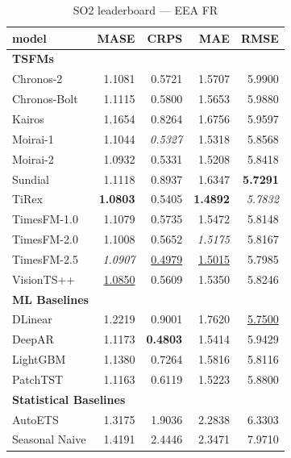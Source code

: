 \begin{table}[H]
\caption{SO2 leaderboard --- EEA FR}
\centering
\begin{small}
\begin{tabular}{lrrrr}
\toprule
model & MASE & CRPS & MAE & RMSE \\
\midrule
\multicolumn{5}{l}{\textbf{TSFMs}} \\
Chronos-2 & 1.1081 & 0.5721 & 1.5707 & 5.9900 \\
Chronos-Bolt & 1.1115 & 0.5800 & 1.5653 & 5.9880 \\
Kairos & 1.1654 & 0.8264 & 1.6756 & 5.9597 \\
Moirai-1 & 1.1044 & \textit{0.5327} & 1.5318 & 5.8568 \\
Moirai-2 & 1.0932 & 0.5331 & 1.5208 & 5.8418 \\
Sundial & 1.1118 & 0.8937 & 1.6347 & \textbf{5.7291} \\
TiRex & \textbf{1.0803} & 0.5405 & \textbf{1.4892} & \textit{5.7832} \\
TimesFM-1.0 & 1.1079 & 0.5735 & 1.5472 & 5.8148 \\
TimesFM-2.0 & 1.1008 & 0.5652 & \textit{1.5175} & 5.8167 \\
TimesFM-2.5 & \textit{1.0907} & \underline{0.4979} & \underline{1.5015} & 5.7985 \\
VisionTS++ & \underline{1.0850} & 0.5609 & 1.5350 & 5.8246 \\
\midrule
\multicolumn{5}{l}{\textbf{ML Baselines}} \\
DLinear & 1.2219 & 0.9001 & 1.7620 & \underline{5.7500} \\
DeepAR & 1.1173 & \textbf{0.4803} & 1.5414 & 5.9429 \\
LightGBM & 1.1380 & 0.7264 & 1.5816 & 5.8116 \\
PatchTST & 1.1163 & 0.6119 & 1.5223 & 5.8800 \\
\midrule
\multicolumn{5}{l}{\textbf{Statistical Baselines}} \\
AutoETS & 1.3175 & 1.9036 & 2.2838 & 6.3303 \\
Seasonal Naive & 1.4191 & 2.4446 & 2.3471 & 7.9710 \\
\bottomrule
\end{tabular}
\end{small}
\end{table}